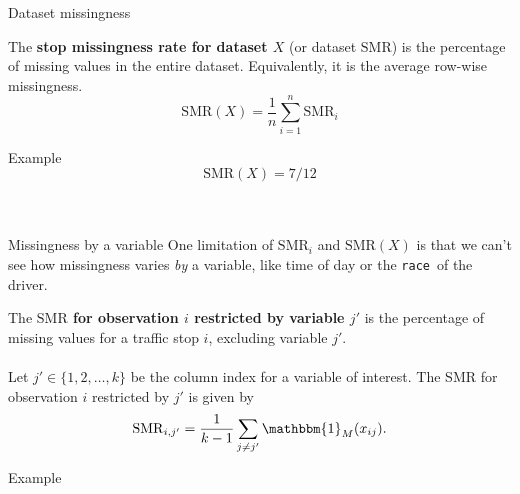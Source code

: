 \documentclass[11pt]{beamer}
\newcommand{\indic}{\mathbbm{1}_M}
\newcommand{\SMR}{\mathrm{SMR}}
\newcommand{\race}{\texttt{race}}
\begin{document}

\begin{frame}{Dataset missingness}
    \begin{definition}
    The {\bf{stop missingness rate for dataset $X$}} (or dataset $\SMR$) is the percentage of missing values in the entire dataset. Equivalently, it is the average row-wise missingness. 
    \begin{equation*}
    \SMR(X) = \dfrac{1}{n} \sum_{i = 1}^{n} \SMR_i
    \end{equation*}
    \end{definition}
    Example
    \begin{equation*}
    \SMR(X) = 7/12
    \end{equation*}
    \\~\\
\end{frame}

\begin{frame}{Missingness by a variable}
    One limitation of $\SMR_i$ and $\SMR(X)$ is that we can't see how missingness varies \emph{by} a variable, like time of day or the \race \, of the driver. 
    \begin{definition}
    The {\bf{$\SMR$ for observation $i$ restricted by variable $j'$}} is the percentage of missing values for a traffic stop $i$, excluding variable $j'$. 
    \\~\\
    Let $j' \in \{1, 2, \ldots, k\}$ be the column index for a variable of interest. The SMR for observation $i$ restricted by $j'$ is given by
    \begin{equation*}
    \SMR_{i, j'} = \dfrac{1}{k-1} \sum_{j \neq j'} \indic(x_{ij}).
    \end{equation*}
    \end{definition}
    Example
\end{frame}
\end{document}
